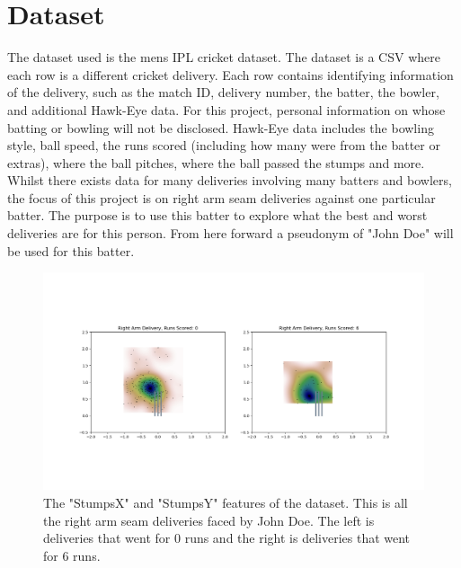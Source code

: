\documentclass[12pt,a4paper]{report}
\theoremstyle{definition}
\begin{document}
\section{Dataset} \label{sec:Dataset}

The dataset used is the mens IPL cricket dataset. 
The dataset is a CSV where each row is a different cricket delivery. 
Each row contains identifying information of the delivery, such as the match ID, delivery number, the batter, the bowler, and additional Hawk-Eye data.
For this project, personal information on whose batting or bowling will not be disclosed. 
Hawk-Eye data includes the bowling style, ball speed, the runs scored (including how many were from the batter or extras), where the ball pitches, where the ball passed the stumps and more.     
Whilst there exists data for many deliveries involving many batters and bowlers, the focus of this project is on right arm seam deliveries against one particular batter.
The purpose is to use this batter to explore what the best and worst deliveries are for this person.
From here forward a pseudonym of "John Doe" will be used for this batter.

\begin{figure}[H]
    \centering
    \includegraphics[width=\linewidth]{right_arm_seam_stumps.png}
    \caption{The "StumpsX" and "StumpsY" features of the dataset. This is all the right arm seam deliveries faced by John Doe. The left is deliveries that went for 0 runs and the right is deliveries that went for 6 runs.}
    \label{fig:StumpsXY}
\end{figure}
\end{document}
